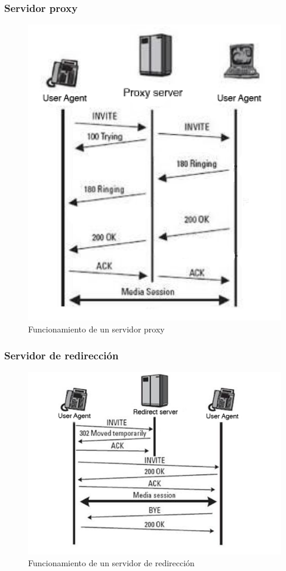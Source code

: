 \documentclass{beamer}
\begin{document}
	\begin{frame}
	\frametitle{Servidor proxy}
		\begin{figure}
			\centering
			\includegraphics[width=0.5\linewidth]{./Sproxy}\\
			Funcionamiento de un servidor proxy
			\label{fig:Sproxy}
		\end{figure}
	\end{frame}
	
	\begin{frame}
	\frametitle{Servidor de redirección}
		\begin{figure}
			\centering
			\includegraphics[width=0.7\linewidth]{./Sredirect}\\
			Funcionamiento de un servidor de redirección
			\label{fig:Sredir}
		\end{figure}
	\end{frame}
	
\end{document}
